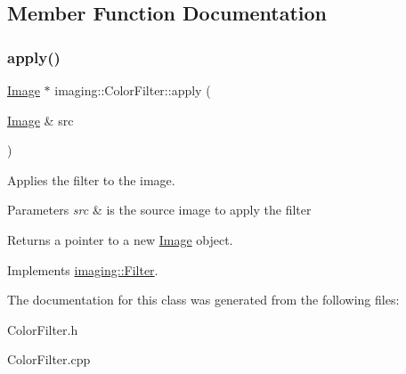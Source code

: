 \subsection{Member Function Documentation}
\mbox{\label{classimaging_1_1_color_filter_a38b3f549e53f0d25b56a388350213782}} 
\subsubsection{\texorpdfstring{apply()}{apply()}}
{\footnotesize\ttfamily \hyperlink{classimaging_1_1_image}{Image} $\ast$ imaging\+::\+Color\+Filter\+::apply (\begin{DoxyParamCaption}\item[{\hyperlink{classimaging_1_1_image}{Image} \&}]{src }\end{DoxyParamCaption})\hspace{0.3cm}{\ttfamily [virtual]}}

Applies the filter to the image.


\begin{DoxyParams}{Parameters}
{\em src} & is the source image to apply the filter\\
\hline
\end{DoxyParams}
\begin{DoxyReturn}{Returns}
a pointer to a new \hyperlink{classimaging_1_1_image}{Image} object. 
\end{DoxyReturn}


Implements \hyperlink{classimaging_1_1_filter_ab153f2e4e89dd744806299a29da8289b}{imaging\+::\+Filter}.



The documentation for this class was generated from the following files\+:\begin{DoxyCompactItemize}
\item 
Color\+Filter.\+h\item 
Color\+Filter.\+cpp\end{DoxyCompactItemize}
